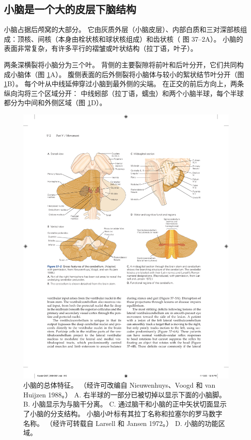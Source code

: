 \subsection{小脑是一个大的皮层下脑结构}

小脑占据后颅窝的大部分。
它由灰质外层（小脑皮层）、内部白质和三对深部核组成：顶核、间核（本身由栓状核和球状核组成）和齿状核（ 图 37–2A）。
小脑的表面非常复杂，有许多平行的褶皱或叶状结构（拉丁语，叶子）。


两条深横裂将小脑分为三个叶。
背侧的主要裂隙将前叶和后叶分开，它们共同构成小脑体（图 \ref{fig:37_2}A）。
腹侧表面的后外侧裂将小脑体与较小的絮状结节叶分开（图 \ref{fig:37_2}B）。
每个叶从中线延伸穿过小脑到最外侧的尖端。
在正交的前后方向上，两条纵向沟将三个区域分开：
中线蚓部（拉丁语，蠕虫）和两个小脑半球，每个半球都分为中间和外侧区域（图 \ref{fig:37_2}D）。


\begin{figure}[htbp]
	\centering
	\includegraphics[width=0.9\linewidth]{chap37/fig_37_2}
	\caption{小脑的总体特征。 （经许可改编自 Nieuwenhuys、Voogd 和 van Huijzen 1988。） A. 右半球的一部分已被切掉以显示下面的小脑脚。 B. 小脑显示为与脑干分离。 C. 通过脑干和小脑的正中矢状切面显示了小脑的分支结构。 小脑小叶标有其拉丁名称和拉塞尔的罗马数字名称。 （经许可转载自 Larsell 和 Jansen 1972。） D. 小脑的功能区域。}
	\label{fig:37_2}
\end{figure}


